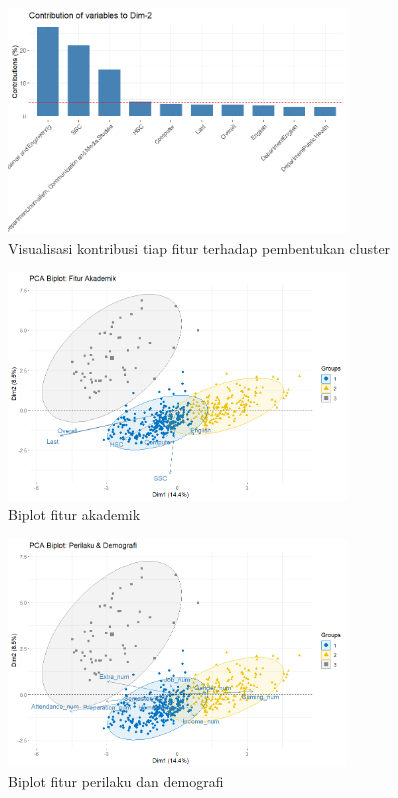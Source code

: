 \begin{figure}[!htpb]
    \centering
    \includegraphics[width=0.8\textwidth]{figures/Dim2.png}
    \caption{Visualisasi kontribusi tiap fitur terhadap pembentukan cluster}
    \label{fig:cluster-contribution2}
\end{figure}

\begin{figure}[!htpb]
    \centering
    \includegraphics[width=0.8\textwidth]{figures/academicplot.png}
    \caption{Biplot fitur akademik}
    \label{fig:biplot-academic}
\end{figure}

\begin{figure}[!htpb]
    \centering
    \includegraphics[width=0.8\textwidth]{figures/habitsplot.png}
    \caption{Biplot fitur perilaku dan demografi}
    \label{fig:biplot-habits}
\end{figure}

